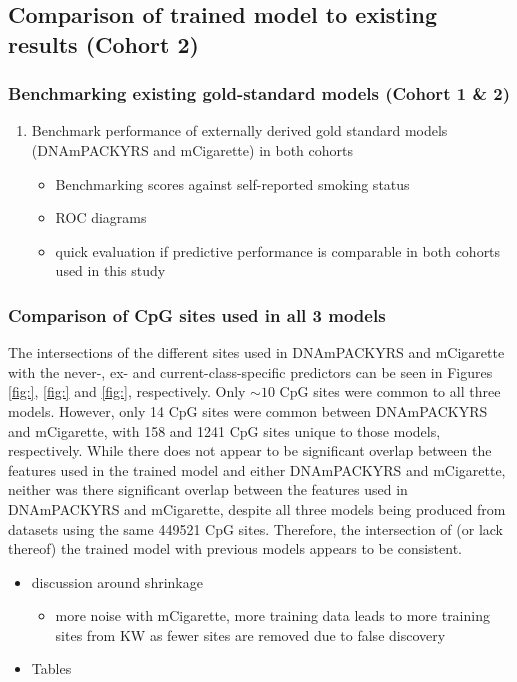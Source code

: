 \documentclass{article}
\begin{document}
\subsection{Comparison of trained model to existing results (Cohort 2)} \label{sec:model-comparisons}

\subsubsection{Benchmarking existing gold-standard models (Cohort 1 \& 2)} \label{sec:prior-benchmarks}
\begin{enumerate}
    \item Benchmark performance of externally derived gold standard models (DNAmPACKYRS and mCigarette) in both cohorts
          \begin{itemize}
              \item Benchmarking scores against self-reported smoking status
              \item ROC diagrams
              \item quick evaluation if predictive performance is comparable in both cohorts used in this study
          \end{itemize}
\end{enumerate}

\subsubsection{Comparison of CpG sites used in all 3 models} \label{sec:sites-comparison}
The intersections of the different sites used in DNAmPACKYRS and mCigarette with the never-, ex- and current-class-specific predictors can be seen in Figures \ref{fig:}, \ref{fig:} and \ref{fig:}, respectively. Only \(\sim \! 10\) CpG sites were common to all three models. However, only 14 CpG sites were common between DNAmPACKYRS and mCigarette, with 158 and 1241 CpG sites unique to those models, respectively. While there does not appear to be significant overlap between the features used in the trained model and either DNAmPACKYRS and mCigarette, neither was there significant overlap between the features used in DNAmPACKYRS and mCigarette, despite all three models being produced from datasets using the same \num{449521} CpG sites. Therefore, the intersection of (or lack thereof) the trained model with previous models appears to be consistent. 

\begin{itemize}
    \item discussion around shrinkage
    \begin{itemize}
        \item more noise with mCigarette, more training data leads to more training sites from KW as fewer sites are removed due to false discovery
    \end{itemize}
    \item Tables
\end{itemize}
\end{document}
